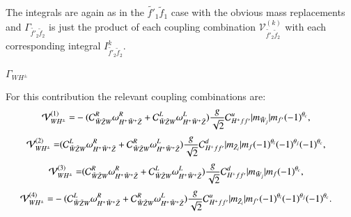 \documentclass[final,3p,times]{elsarticle}
\begin{document}
The integrals are again as in the $\tilde{f'}_1 \tilde{f}_1$ case with the obvious mass replacements and $\Gamma_{\tilde{f'}_2 \tilde{f}_2}$ is just the product of each coupling combination $\mathcal{V}_{\tilde{f'}_2 \tilde{f}_2}^{(k)}$ with each corresponding integral $I_{\tilde{f'}_2 \tilde{f}_2}^{k}$.

\textbf{\underline{$\Gamma_{W H^{\pm}}$}}

For this contribution the relevant coupling combinations are:
\begin{equation}
\begin{aligned}
\mathcal{V}_{W H^{\pm}}^{(1)} = & -(\mathcal{C}_{\tilde{W} \tilde{Z} W}^R \omega_{H^+ \tilde{W}^+ \tilde{Z}}^R + \mathcal{C}_{\tilde{W} \tilde{Z} W}^L \omega_{H^+ \tilde{W}^+ \tilde{Z}}^L){g \over \sqrt{2}} \mathcal{C}_{H^+ f f'}^u |m_{\tilde{W}_j}|m_{f'}(-1)^{\theta_c},
\end{aligned}
\end{equation}
\begin{equation}
\begin{aligned}
\mathcal{V}_{W H^{\pm}}^{(2)} = & (\mathcal{C}_{\tilde{W} \tilde{Z} W}^L \omega_{H^+ \tilde{W}^+ \tilde{Z}}^R + \mathcal{C}_{\tilde{W} \tilde{Z} W}^R \omega_{H^+ \tilde{W}^+ \tilde{Z}}^L){g \over \sqrt{2}} \mathcal{C}_{H^+ f f'}^d |m_{\tilde{Z}_i}|m_{f} (-1)^{\theta_i}(-1)^{\theta_j}(-1)^{\theta_c},
\end{aligned}
\end{equation}
\begin{equation}
\begin{aligned}
\mathcal{V}_{W H^{\pm}}^{(3)} = & (\mathcal{C}_{\tilde{W} \tilde{Z} W}^R \omega_{H^+ \tilde{W}^+ \tilde{Z}}^R + \mathcal{C}_{\tilde{W} \tilde{Z} W}^L  \omega_{H^+ \tilde{W}^+ \tilde{Z}}^L){g \over \sqrt{2}} \mathcal{C}_{H^+ f f'}^d  |m_{\tilde{W}_j}|m_{f} (-1)^{\theta_c},
\end{aligned}
\end{equation}
\begin{equation}
\begin{aligned}
\mathcal{V}_{W H^{\pm}}^{(4)} = & -(\mathcal{C}_{\tilde{W} \tilde{Z} W}^L  \omega_{H^+ \tilde{W}^+ \tilde{Z}}^R + \mathcal{C}_{\tilde{W} \tilde{Z} W}^R  \omega_{H^+ \tilde{W}^+ \tilde{Z}}^L) {g \over \sqrt{2}} \mathcal{C}_{H^+ f f'}^u |m_{\tilde{Z}_i}| m_{f'}(-1)^{\theta_i} (-1)^{\theta_j} (-1)^{\theta_c}.
\end{aligned}
\end{equation}
\end{document}
